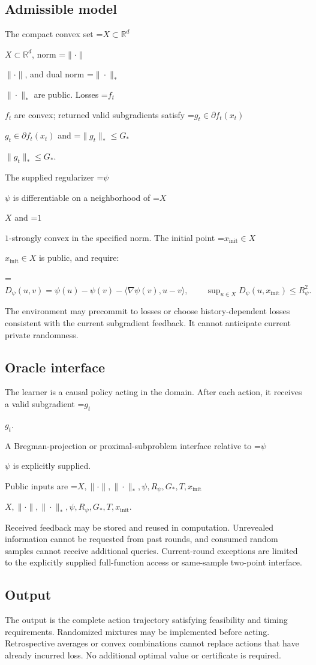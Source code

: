 \documentclass[10pt,a4paper]{article}
\newcommand{\AtlasMath}[1]{\par\begingroup\centering\setbox0=\hbox{$\displaystyle #1$}\ifdim\wd0>1.4\linewidth\typeout{ATLAS WIDE FORMULA: \the\wd0}\fi\ifdim\wd0>\linewidth\resizebox{\linewidth}{!}{\box0}\else\box0\fi\par\endgroup}
\newcommand{\AtlasInlineMath}[1]{\begingroup\setbox0=\hbox{$#1$}\ifdim\wd0>.4\linewidth\endgroup\AtlasMath{#1}\else\endgroup$#1$\fi}
\begin{document}
\subsection{Admissible model}
The compact convex set \AtlasInlineMath{X\subset\mathbb{R}^d}, norm \AtlasInlineMath{\|\cdot\|}, and dual norm \AtlasInlineMath{\|\cdot\|_*} are public. Losses \AtlasInlineMath{f_t} are convex; returned valid subgradients satisfy \AtlasInlineMath{g_t\in\partial f_t(x_t)} and \AtlasInlineMath{\|g_t\|_*\le G_*}.

The supplied regularizer \AtlasInlineMath{\psi} is differentiable on a neighborhood of \AtlasInlineMath{X} and \AtlasInlineMath{1}-strongly convex in the specified norm. The initial point \AtlasInlineMath{x_{\mathrm{init}}\in X} is public, and require:


\AtlasMath{D_\psi(u,v)=\psi(u)-\psi(v)-\langle\nabla\psi(v),u-v\rangle,\qquad \sup_{u\in X}D_\psi(u,x_{\mathrm{init}})\le R_\psi^2.}


The environment may precommit to losses or choose history-dependent losses consistent with the current subgradient feedback. It cannot anticipate current private randomness.

\subsection{Oracle interface}
The learner is a causal policy acting in the domain. After each action, it receives a valid subgradient \AtlasInlineMath{g_t}.

A Bregman-projection or proximal-subproblem interface relative to \AtlasInlineMath{\psi} is explicitly supplied.

Public inputs are \AtlasInlineMath{X,\|\cdot\|,\|\cdot\|_*,\psi,R_\psi,G_*,T,x_{\mathrm{init}}}.

Received feedback may be stored and reused in computation. Unrevealed information cannot be requested from past rounds, and consumed random samples cannot receive additional queries. Current-round exceptions are limited to the explicitly supplied full-function access or same-sample two-point interface.

\subsection{Output}
The output is the complete action trajectory satisfying feasibility and timing requirements. Randomized mixtures may be implemented before acting. Retrospective averages or convex combinations cannot replace actions that have already incurred loss. No additional optimal value or certificate is required.
\end{document}
